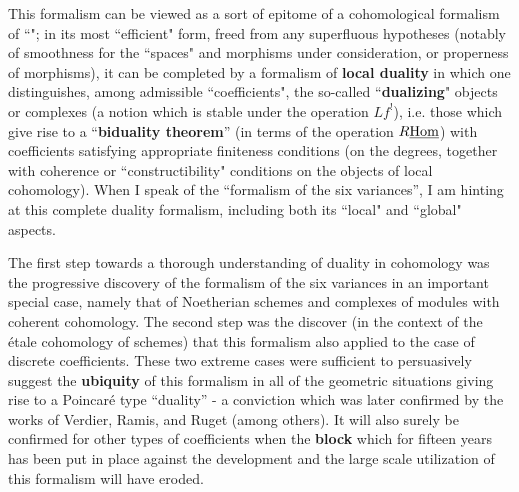 \label{note:46.2}

This formalism can be viewed as a sort of epitome of a cohomological formalism of
``"; in its most ``efficient" form, freed from any superfluous hypotheses (notably of
smoothness for the ``spaces" and morphisms under consideration, or properness of morphisms),
it can be completed by a formalism of \textbf{local duality} in which one distinguishes,
among admissible ``coefficients", the
so-called ``\textbf{dualizing}" objects or complexes (a notion which is stable under the operation
$Lf^!$), i.e. those which give rise to a ``\textbf{biduality theorem}''
(in terms of the operation $R\underline{\operatorname{Hom}}$) 
with coefficients satisfying appropriate finiteness conditions (on the degrees, together
with coherence or ``constructibility" conditions on the objects of local cohomology).
When I speak of the ``formalism of the six variances'', I am 
hinting at this complete duality formalism, including both its ``local" and ``global" aspects. 

The first step towards a thorough understanding of duality in cohomology was
the progressive discovery of the formalism of the six variances in an important
special case, namely that of Noetherian schemes and complexes of modules with coherent
cohomology. 
The second step was the discover (in the context of the \'etale cohomology of schemes)
that this formalism also applied to the case of discrete coefficients. 
These two extreme cases were sufficient to 
persuasively suggest the \textbf{ubiquity} of this formalism in all of the geometric situations
giving rise to a Poincar\'e type ``duality'' - a conviction which was later confirmed by
the works of Verdier, Ramis, and Ruget (among others).
It will also surely be confirmed for other types of coefficients when the \textbf{block}
which for fifteen years has been put in place against the development and the large scale
utilization of this formalism will have eroded. 

\label{note:46.3}
\label{note:46.4}
\label{note:46.5}
\label{note:46.6}
\label{note:46.7}
\label{note:46.8}
\label{note:46.9}

\subsection{}

\label{note:47}
\label{note:47.1}
\label{note:47.2}
\label{note:47.3}

